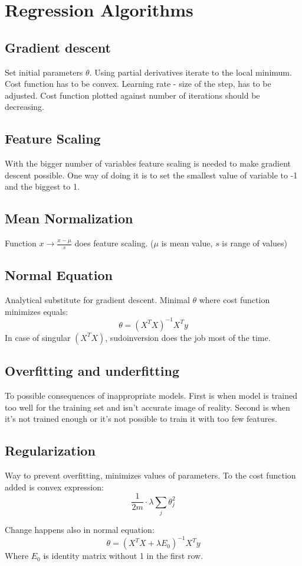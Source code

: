 \section{Regression Algorithms}
        \subsection{Gradient descent}
            Set initial parameters $\theta$. Using partial derivatives iterate to the local minimum. Cost function has to be convex. Learning rate - size of the step, has to be adjusted. Cost function plotted against number of iterations should be decreasing. 
        
        \subsection{Feature Scaling}
            With the bigger number of variables feature scaling is needed to make gradient descent possible. One way of doing it is to set the smallest value of variable to -1 and the biggest to 1.
        
        \subsection{Mean Normalization}
            Function $x \rightarrow \tfrac{x - \mu}{s}$ does feature scaling. ($\mu$ is mean value, $s$ is range of values)
        
        \subsection{Normal Equation}
            Analytical substitute for gradient descent. Minimal $\theta$ where cost function minimizes equals:
            \begin{equation*}
                \theta = (X^TX)^{-1}X^Ty
            \end{equation*}
            In case of singular $(X^TX)$, sudoinversion does the job most of the time.
        \subsection{Overfitting and underfitting}
            To possible consequences of inappropriate models. First is when model is trained too well for the training set and isn't accurate image of reality. Second is when it's not trained enough or it's not possible to train it with too few features.
        \subsection{Regularization}
            Way to prevent overfitting, minimizes values of parameters. To the cost function added is convex expression:
            \begin{equation*}
                \frac{1}{2m} \cdot \lambda \sum\limits_{j} \theta_j^2  
            \end{equation*}
            
            Change happens also in normal equation:
            \begin{equation*}
                \theta = (X^TX + \lambda E_0)^{-1}X^Ty
            \end{equation*}
            Where $E_0$ is identity matrix without 1 in the first row.
        